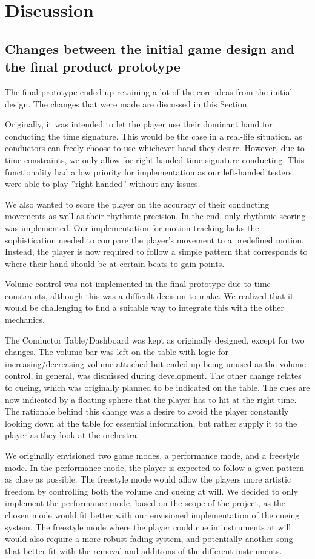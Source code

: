 \chapter{Discussion} \label{chap:discussion}
\section{Changes between the initial game design and the final product prototype}
The final prototype ended up retaining a lot of the core ideas from the initial design. The changes that were made are discussed in this Section. 

Originally, it was intended to let the player use their dominant hand for conducting the time signature. This would be the case in a real-life situation, as conductors can freely choose to use whichever hand they desire. However, due to time constraints, we only allow for right-handed time signature conducting. This functionality had a low priority for implementation as our left-handed testers were able to play ''right-handed'' without any issues. 

We also wanted to score the player on the accuracy of their conducting movements as well as their rhythmic precision. In the end, only rhythmic scoring was implemented. Our implementation for motion tracking lacks the sophistication needed to compare the player’s movement to a predefined motion. Instead, the player is now required to follow a simple pattern that corresponds to where their hand should be at certain beats to gain points.

Volume control was not implemented in the final prototype due to time constraints, although this was a difficult decision to make. We realized that it would be challenging to find a suitable way to integrate this with the other mechanics.

The Conductor Table/Dashboard was kept as originally designed, except for two changes. The volume bar was left on the table with logic for increasing/decreasing volume attached but ended up being unused as the volume control, in general, was dismissed during development. The other change relates to cueing, which was originally planned to be indicated on the table. The cues are now indicated by a floating sphere that the player has to hit at the right time. The rationale behind this change was a desire to avoid the player constantly looking down at the table for essential information, but rather supply it to the player as they look at the orchestra.

We originally envisioned two game modes, a performance mode, and a freestyle mode. In the performance mode, the player is expected to follow a given pattern as close as possible. The freestyle mode would allow the players more artistic freedom by controlling both the volume and cueing at will. We decided to only implement the performance mode, based on the scope of the project, as the chosen mode would fit better with our envisioned implementation of the cueing system. The freestyle mode where the player could cue in instruments at will would also require a more robust fading system, and potentially another song that better fit with the removal and additions of the different instruments. 



